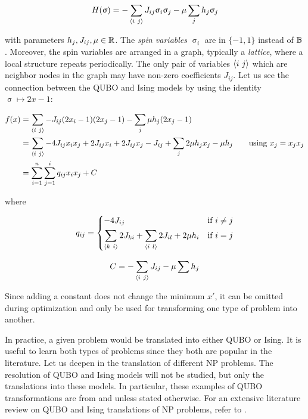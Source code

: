 $$ H(\upsigma) = - \sum_{\langle i ~ j \rangle} J_{ij} \upsigma_i \upsigma_j - \mu \sum_j h_j \upsigma_j $$

with parameters $h_j, J_{ij}, \mu \in \mathbb{R}$. The \emph{spin variables} $\upsigma_i$ are in $\{-1, 1\}$ instead of $\mathbb{B}$. Moreover, the spin variables are arranged in a graph, typically a \emph{lattice}, where a local structure repeats periodically. The only pair of variables $\langle i ~ j \rangle$ which are neighbor nodes in the graph may have non-zero coefficients $J_{ij}$. Let us see the connection between the QUBO and Ising models by using the identity $\upsigma \mapsto 2x -1$:

\begin{equation*}
	\begin{split}
		f(x)	& = \sum_{\langle i ~ j \rangle} - J_{ij} (2x_i - 1) (2x_j - 1) - \sum_j \mu h_j (2x_j - 1) \\
				& = \sum_{\langle i ~ j \rangle} - 4J_{ij} x_i x_j + 2J_{ij} x_i + 2J_{ij} x_j - J_{ij} + \sum_j 2 \mu h_j x_j - \mu h_j \qquad \text{using }  x_j = x_jx_j \\
				& = \sum_{i=1}^n \sum_{j=1}^i q_{ij} x_i x_j + C
	\end{split}
\end{equation*}

where 

\begin{equation*}
	q_{ij} = 
		\begin{dcases}
			-4 J_{ij} 																	& \text{if } i \neq j \\
			\sum_{\langle k ~ i \rangle} 2 J_{ki} + \sum_{\langle i ~ l \rangle} 2 J_{il} + 2 \mu h_i	& \text{if } i = j
		\end{dcases}
\end{equation*}

$$ C = - \sum_{\langle i ~ j \rangle} J_{ij} - \mu \sum h_j $$

Since adding a constant does not change the minimum $x'$, it can be omitted during optimization and only be used for transforming one type of problem into another.

In practice, a given problem would be translated into either QUBO or Ising. It is useful to learn both types of problems since they both are popular in the literature. Let us deepen in the translation of different NP problems. The resolution of QUBO and Ising models will not be studied, but only the translations into these models. In particular, these examples of QUBO transformations are from \cite{Glover2019} and \cite{Lucas2014} unless stated otherwise. For an extensive literature review on QUBO and Ising translations of NP problems, refer to \cite{Kochenberger2014}.


